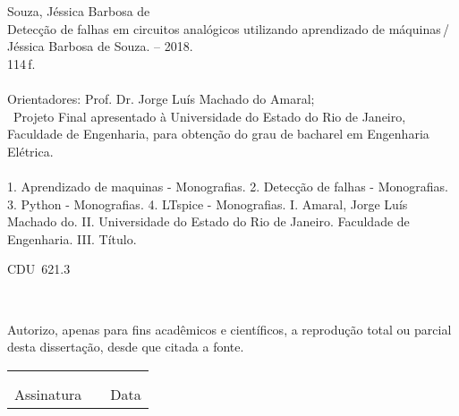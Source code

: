 \begin{titlepage}
\begin{center}
\begin{boxedminipage}{140mm}
{\begin{minipage}[top]{115mm}
		Souza, Jéssica Barbosa de\\
		\phantom{XX}Detecção de falhas em circuitos analógicos
utilizando aprendizado de máquinas\,/\, Jéssica Barbosa
de Souza. -- 2018.\\
		\phantom{XX}114\,f.\\
		\phantom{XX}\\
		\phantom{XX}Orientadores: Prof. Dr. Jorge Luís Machado do Amaral;\\
\hspace*{5mm}
\
       		\phantom{XX}Projeto Final apresentado à Universidade do Estado
do Rio de Janeiro, Faculdade de Engenharia, para
obtenção do grau de bacharel em Engenharia Elétrica.\\
		\phantom{XX}\\
		\phantom{XX}  1. Aprendizado de maquinas - Monografias. 2.
Detecção de falhas - Monografias. 3. Python -
Monografias. 4. LTspice - Monografias. I. Amaral,
Jorge Luís Machado do. II. Universidade do Estado do
Rio de Janeiro. Faculdade de Engenharia. III. Título.
	\end{minipage}}
	\vspace*{5mm}
	\begin{flushright}
	 CDU~621.3
	\end{flushright}
    \vspace{1mm}
	\end{boxedminipage}\\
	\end{center}
%
	Autorizo, apenas para fins acadêmicos e científicos, a reprodução total ou parcial desta dissertação, desde que citada a fonte.\\
	\noindent
	\begin{tabular}{ccc}
	\phantom{XXXXXXXXXXXXXXXXXXXXXXXXXXXXXX}&	 \phantom{XX}	&	\phantom{XXXXXXXXXXXXXXXX}	\\
	\phantom{XXXXXXXXXXXXXXXXXXXXXXXXXXXXXX}&	 \phantom{XX}	&	\phantom{XXXXXXXXXXXXXXXX}	\\
	\cline{1-1}\cline{3-3}
	Assinatura &		&	Data
	\end{tabular}
\end{titlepage} 